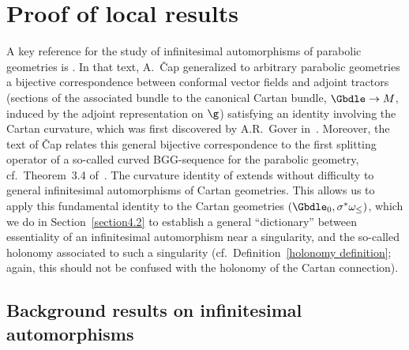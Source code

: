 \section{Proof of local results}\label{section4}

A key reference for the study of inf\/initesimal automorphisms of parabolic geometries is \cite{Cap inf aut}. In that text, A.~\v{C}ap generalized to arbitrary parabolic geometries a bijective correspondence between conformal vector f\/ields and adjoint tractors (sections of the associated bundle to the canonical Cartan bundle, $\Gbdle \rightarrow M$, induced by the adjoint representation on $\g$) satisfying an identity involving the Cartan curvature, which was f\/irst discovered by A.R.~Gover in~\cite{Gover}. Moreover, the text of \v{C}ap relates this general bijective correspondence to the f\/irst splitting operator of a so-called curved BGG-sequence for the parabolic geometry, cf.\ Theorem~3.4 of~\cite{Cap inf aut}. The curvature identity of \cite{Cap inf aut} extends without dif\/f\/iculty to general inf\/initesimal automorphisms of Cartan geometries. This allows us to apply this fundamental identity to the Cartan geometries $(\Gbdle_0,\sigma^*\omega_{\leq})$, which we do in Section~\ref{section4.2} to establish a general ``dictionary'' between essentiality of an inf\/initesimal automorphism near a singularity, and the so-called holonomy associated to such a singularity (cf.\ Def\/inition~\ref{holonomy definition}; again, this should not be confused with the holonomy of the Cartan connection).

\subsection{Background results on inf\/initesimal automorphisms}\label{section4.1}

